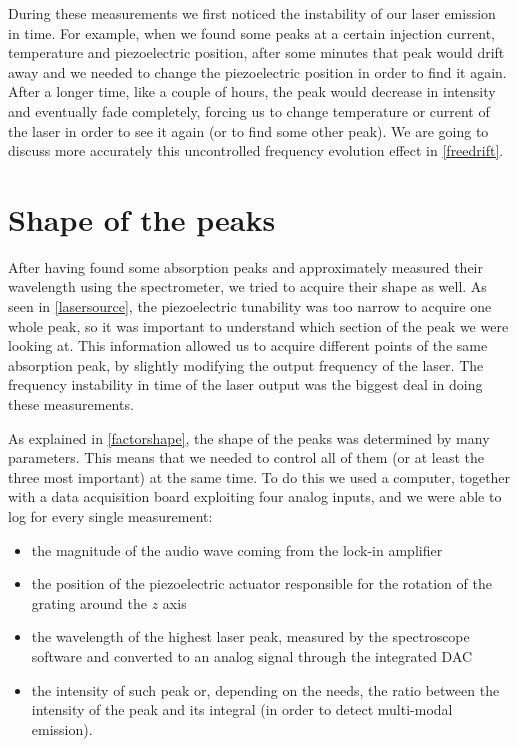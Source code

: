 During these measurements we first noticed the instability of our laser emission in time. For example, when we found some peaks at a certain injection current, temperature and piezoelectric position, after some minutes that peak would drift away and we needed to change the piezoelectric position in order to find it again. After a longer time, like a couple of hours, the peak would decrease in intensity and eventually fade completely, forcing us to change temperature or current of the laser
in order to see it again (or to find some other peak). We are going to discuss more accurately this uncontrolled frequency evolution effect in \cref{freedrift}. 

\section{Shape of the peaks}\label{shapeaks}
\label{factorsinfluencingtheshapeofthepeaks}
After having found some absorption peaks and approximately measured their wavelength using the spectrometer, we tried to acquire their shape as well. As seen in \cref{lasersource}, the piezoelectric tunability was too narrow to acquire one whole peak, so it was important to understand which section of the peak we were looking at. This information allowed us to acquire different points of the same absorption peak, by slightly modifying the output frequency of the laser. The frequency instability in time of the laser output was the biggest deal in doing these measurements. 

As explained in \cref{factorshape}, the shape of the peaks was determined by many parameters. This means that we needed to control all of them (or at least the three most important) at the same time. To do this we used a computer, together with a data acquisition board exploiting four analog inputs, and we were able to log for every single measurement:
\begin{itemize}
	\item the magnitude of the audio wave coming from the lock-in amplifier
	\item the position of the piezoelectric actuator responsible for the rotation of the grating around the $z$ axis
	\item the wavelength of the highest laser peak, measured by the spectroscope software and converted to an analog signal through the integrated DAC
	\item the intensity of such peak or, depending on the needs, the ratio between the intensity of the peak and its integral (in order to detect multi-modal emission).
\end{itemize}

